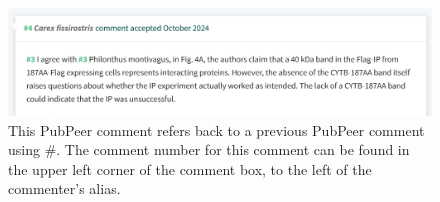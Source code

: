 \documentclass[letterpaper, 12pt]{article}
\begin{document}
\begin{figure}[h!tbp]
    \includegraphics[width=\textwidth]{img/pubpeer/Screenshot 2024-10-23 at 16-36-04 PubPeer - A novel protein CYTB-187AA encoded by the mitochondrial gene.png}
    \caption*{This PubPeer comment refers back to a previous PubPeer comment using \#. The comment number for this comment can be found in the upper left corner of the comment box, to the left of the commenter's alias.}
\end{figure}
\end{document}
